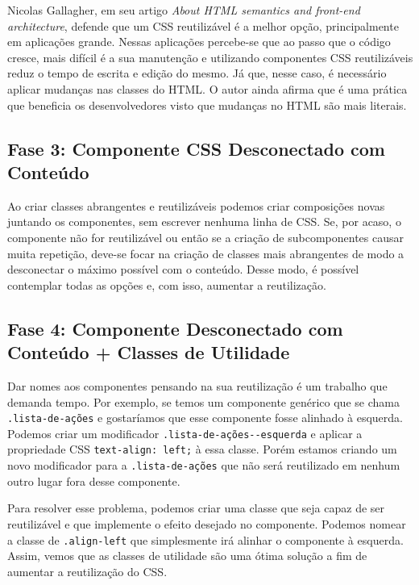 Nicolas Gallagher, em seu artigo \emph{About HTML semantics and
front-end architecture}, defende que um CSS reutilizável é a melhor
opção, principalmente em aplicações grande. Nessas aplicações percebe-se
que ao passo que o código cresce, mais difícil é a sua manutenção e
utilizando componentes CSS reutilizáveis reduz o tempo de escrita e
edição do mesmo. Já que, nesse caso, é necessário aplicar mudanças nas
classes do HTML. O autor ainda afirma que é uma prática que beneficia os
desenvolvedores visto que mudanças no HTML são mais literais.

\hypertarget{fase-3-componente-css-desconectado-com-conteuxfado}{%
\subsection{Fase 3: Componente CSS Desconectado com
Conteúdo}\label{fase-3-componente-css-desconectado-com-conteuxfado}}

Ao criar classes abrangentes e reutilizáveis podemos criar composições
novas juntando os componentes, sem escrever nenhuma linha de CSS. Se,
por acaso, o componente não for reutilizável ou então se a criação de
subcomponentes causar muita repetição, deve-se focar na criação de
classes mais abrangentes de modo a desconectar o máximo possível com o
conteúdo. Desse modo, é possível contemplar todas as opções e, com isso,
aumentar a reutilização.

\hypertarget{fase-4-componente-desconectado-com-conteuxfado-classes-de-utilidade}{%
\subsection{Fase 4: Componente Desconectado com Conteúdo + Classes de
Utilidade}\label{fase-4-componente-desconectado-com-conteuxfado-classes-de-utilidade}}

Dar nomes aos componentes pensando na sua reutilização é um trabalho que
demanda tempo. Por exemplo, se temos um componente genérico que se chama
\texttt{.lista-de-ações} e gostaríamos que esse componente fosse
alinhado à esquerda. Podemos criar um modificador
\texttt{.lista-de-ações-\/-esquerda} e aplicar a propriedade CSS
\texttt{text-align:\ left;} à essa classe. Porém estamos criando um novo
modificador para a \texttt{.lista-de-ações} que não será reutilizado em
nenhum outro lugar fora desse componente.

Para resolver esse problema, podemos criar uma classe que seja capaz de
ser reutilizável e que implemente o efeito desejado no componente.
Podemos nomear a classe de \texttt{.align-left} que simplesmente irá
alinhar o componente à esquerda. Assim, vemos que as classes de
utilidade são uma ótima solução a fim de aumentar a reutilização do CSS.

